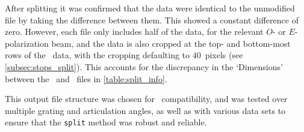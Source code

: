 

After splitting it was confirmed that the data were identical to the unmodified file by taking the difference between them. This showed a constant difference of zero.  However, each file only includes half of the data, for the relevant $O$- or $E$-polarization beam, and the  data is also cropped at the top- and bottom-most rows of the \polsalt\ data, with the cropping defaulting to $40$~pixels (see \autoref{subsec:stops_split}). This accounts for the discrepancy in the `Dimensions' between the \polsalt\ and \stops\ files in \autoref{table:split_info}.

This output file structure was chosen for \iraf\ compatibility, and was tested over multiple grating and articulation angles, as well as with various data sets to ensure that the \texttt{split} method was robust and reliable.

